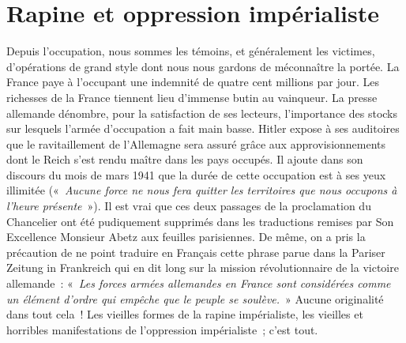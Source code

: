 \documentclass[french,twoside]{book} %
\begin{document}
\section[Rapine et oppression impérialiste]{Rapine et oppression impérialiste}
\noindent Depuis l’occupation, nous sommes les témoins, et généralement les victimes, d’opérations de grand style dont nous nous gardons de méconnaître la portée. La France paye à l’occupant une indemnité de quatre cent millions par jour. Les richesses de la France tiennent lieu d’immense butin au vainqueur. La presse allemande dénombre, pour la satisfaction de ses lecteurs, l’importance des stocks sur lesquels l’armée d’occupation a fait main basse. Hitler expose à ses auditoires que le ravitaillement de l’Allemagne sera assuré grâce aux approvisionnements dont le Reich s’est rendu maître dans les pays occupés. Il ajoute dans son discours du mois de mars 1941 que la durée de cette occupation est à ses yeux illimitée (« \emph{Aucune force ne nous fera quitter les territoires que nous occupons à l’heure présente} »). Il est vrai que ces deux passages de la proclamation du Chancelier ont été pudiquement supprimés dans les traductions remises par Son Excellence Monsieur Abetz aux feuilles parisiennes. De même, on a pris la précaution de ne point traduire en Français cette phrase parue dans la Pariser Zeitung in Frankreich qui en dit long sur la mission révolutionnaire de la victoire allemande : « \emph{Les forces armées allemandes en France sont considérées comme un élément d’ordre qui empêche que le peuple se soulève.} » Aucune originalité dans tout cela ! Les vieilles formes de la rapine impérialiste, les vieilles et horribles manifestations de l’oppression impérialiste ; c’est tout.
\end{document}
